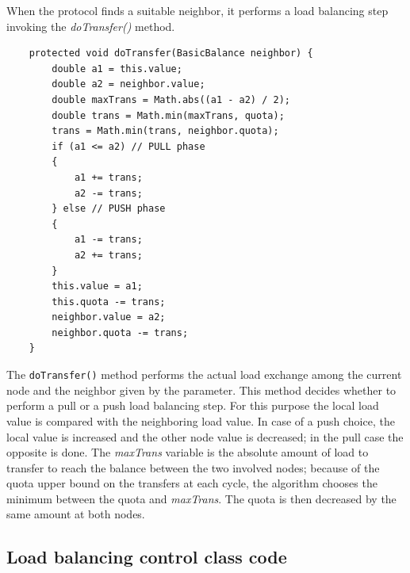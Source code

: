 \documentclass[a4paper,11pt]{article}
\begin{document}
When the protocol finds a suitable neighbor, it performs a load balancing
step invoking the \emph{doTransfer()} method.

\footnotesize
\begin{verbatim}
    protected void doTransfer(BasicBalance neighbor) {
        double a1 = this.value;
        double a2 = neighbor.value;
        double maxTrans = Math.abs((a1 - a2) / 2);
        double trans = Math.min(maxTrans, quota);
        trans = Math.min(trans, neighbor.quota);
        if (a1 <= a2) // PULL phase
        {
            a1 += trans;
            a2 -= trans;
        } else // PUSH phase
        {
            a1 -= trans;
            a2 += trans;
        }
        this.value = a1;
        this.quota -= trans;
        neighbor.value = a2;
        neighbor.quota -= trans;
    }
\end{verbatim}
\normalsize


The \texttt{doTransfer()} method performs the actual load exchange
among the current node and the neighbor given by the parameter.
This method decides whether to perform a pull or a
push load balancing step. For this purpose the local load value
is compared with the neighboring load value. In case of a push choice,
the local value is increased and the other node value is decreased;
in the pull case the opposite is done. The \emph{maxTrans}
variable is the absolute amount of load to transfer
to reach the balance between the two involved nodes; because of the
quota upper bound on the transfers at each cycle, the algorithm chooses
the minimum between the quota and \emph{maxTrans}.
The quota is then decreased by the same amount at both nodes.


\subsection{Load balancing control class code}
\end{document}
